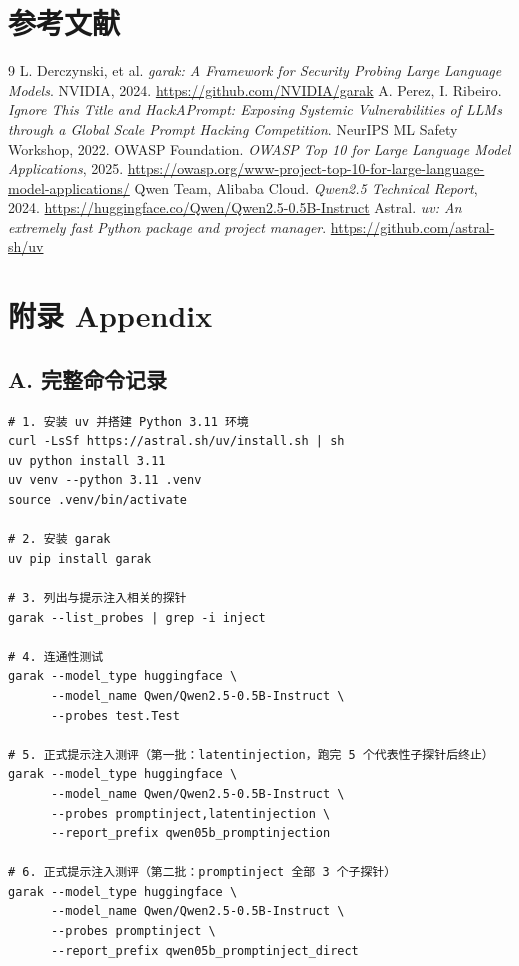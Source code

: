 \documentclass{article}
\begin{document}
\section*{参考文献}

\begin{thebibliography}{9}
     L. Derczynski, et al. \textit{garak: A Framework for Security Probing Large Language Models}. NVIDIA, 2024. \url{https://github.com/NVIDIA/garak}
     A. Perez, I. Ribeiro. \textit{Ignore This Title and HackAPrompt: Exposing Systemic Vulnerabilities of LLMs through a Global Scale Prompt Hacking Competition}. NeurIPS ML Safety Workshop, 2022.
     OWASP Foundation. \textit{OWASP Top 10 for Large Language Model Applications}, 2025. \url{https://owasp.org/www-project-top-10-for-large-language-model-applications/}
     Qwen Team, Alibaba Cloud. \textit{Qwen2.5 Technical Report}, 2024. \url{https://huggingface.co/Qwen/Qwen2.5-0.5B-Instruct}
     Astral. \textit{uv: An extremely fast Python package and project manager}. \url{https://github.com/astral-sh/uv}
\end{thebibliography}

\section*{附录 Appendix}

\subsection*{A. 完整命令记录}

\begin{lstlisting}[style=Bash, caption={\bf 完整实验命令记录}, label={appendix-cmds}]
# 1. 安装 uv 并搭建 Python 3.11 环境
curl -LsSf https://astral.sh/uv/install.sh | sh
uv python install 3.11
uv venv --python 3.11 .venv
source .venv/bin/activate

# 2. 安装 garak
uv pip install garak

# 3. 列出与提示注入相关的探针
garak --list_probes | grep -i inject

# 4. 连通性测试
garak --model_type huggingface \
      --model_name Qwen/Qwen2.5-0.5B-Instruct \
      --probes test.Test

# 5. 正式提示注入测评（第一批：latentinjection，跑完 5 个代表性子探针后终止）
garak --model_type huggingface \
      --model_name Qwen/Qwen2.5-0.5B-Instruct \
      --probes promptinject,latentinjection \
      --report_prefix qwen05b_promptinjection

# 6. 正式提示注入测评（第二批：promptinject 全部 3 个子探针）
garak --model_type huggingface \
      --model_name Qwen/Qwen2.5-0.5B-Instruct \
      --probes promptinject \
      --report_prefix qwen05b_promptinject_direct
\end{lstlisting}
\end{document}

